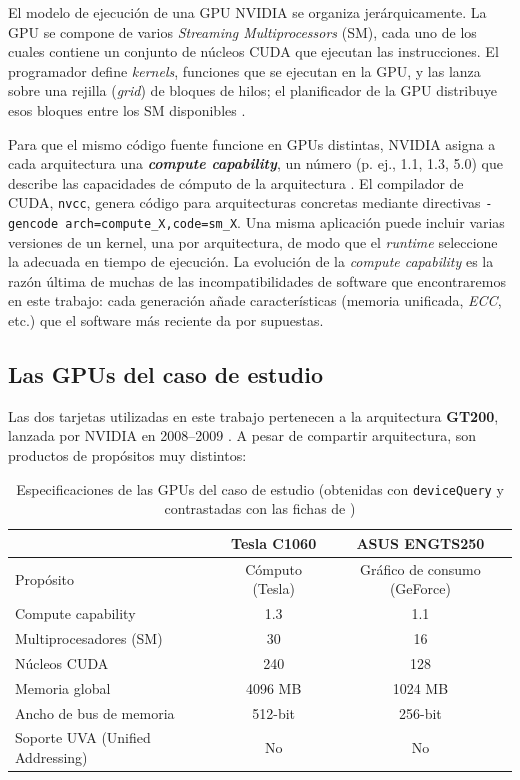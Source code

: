 El modelo de ejecución de una GPU NVIDIA se organiza jerárquicamente. La GPU se compone de varios 
\textit{Streaming Multiprocessors} (SM), cada uno de los cuales contiene un conjunto de núcleos CUDA que ejecutan las instrucciones.
 El programador define \textit{kernels}, funciones que se ejecutan en la GPU, y las lanza sobre una rejilla (\textit{grid}) 
 de bloques de hilos; el planificador de la GPU distribuye esos bloques entre los SM disponibles \cite{nvidia_cuda_programming}.

Para que el mismo código fuente funcione en GPUs distintas, NVIDIA asigna a cada arquitectura una 
\textbf{\textit{compute capability}}, un número (p. ej., 1.1, 1.3, 5.0) que describe las capacidades 
de cómputo de la arquitectura \cite{nvidia_legacy_gpus,realworldtech_gt200}. 
El compilador de CUDA, \texttt{nvcc}, genera código para arquitecturas concretas mediante directivas
 \texttt{-gencode arch=compute\_X,code=sm\_X}. Una misma aplicación puede incluir varias versiones de un kernel, 
 una por arquitectura, de modo que el \textit{runtime} seleccione la adecuada en tiempo de ejecución. La evolución de la 
 \textit{compute capability} es la razón última de muchas de las incompatibilidades de software que encontraremos en este trabajo: 
 cada generación añade características (memoria unificada, \textit{ECC}, etc.) que el software más reciente da por supuestas.

\subsection{Las GPUs del caso de estudio}

Las dos tarjetas utilizadas en este trabajo pertenecen a la arquitectura \textbf{GT200}, lanzada por NVIDIA en 2008--2009 \cite{nvidia_legacy_gpus,realworldtech_gt200}. A pesar de compartir arquitectura, son productos de propósitos muy distintos:

\begin{table}[htbp]
\centering
\setlength{\tabcolsep}{4pt}
\begin{tabular}{|l|c|c|}
\hline
 & \textbf{Tesla C1060} & \textbf{ASUS ENGTS250} \\
\hline
Propósito & Cómputo (Tesla) & Gráfico de consumo (GeForce) \\
\hline
Compute capability & 1.3 & 1.1 \\
\hline
Multiprocesadores (SM) & 30 & 16 \\
\hline
Núcleos CUDA & 240 & 128 \\
\hline
Memoria global & 4096 MB & 1024 MB \\
\hline
Ancho de bus de memoria & 512-bit & 256-bit \\
\hline
Soporte UVA (Unified Addressing)& No & No \\
\hline
\end{tabular}
\caption{Especificaciones de las GPUs del caso de estudio (obtenidas con \texttt{deviceQuery} y contrastadas con las fichas de \cite{videocardz_gt200,videocardz_c1060})}
\label{tab:gpus}
\end{table}

